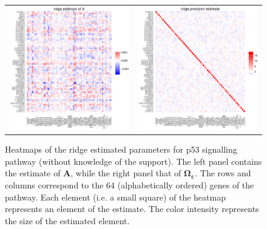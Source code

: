 \begin{figure}[h!]
\centering
\begin{tabular}{cc}
\includegraphics[scale=0.3]{Ahat_nonSparse.eps}
&
\includegraphics[scale=0.3]{Phat_nonSparse.eps}
\end{tabular}
\caption{Heatmaps of the ridge estimated parameters for p53 signalling pathway (without knowledge of the support). The left panel contains the estimate of $\mathbf{A}$, while the right panel that of $\boldsymbol{\Omega_{\varepsilon}}$. The rows and columns correspond to the 64 (alphabetically ordered) genes of the pathway. Each element (i.e. a small square) of the heatmap represents an element of the estimate. The color intensity represents the size of the estimated element.
}
\label{figSM:ridgeEstimates}
\end{figure}

